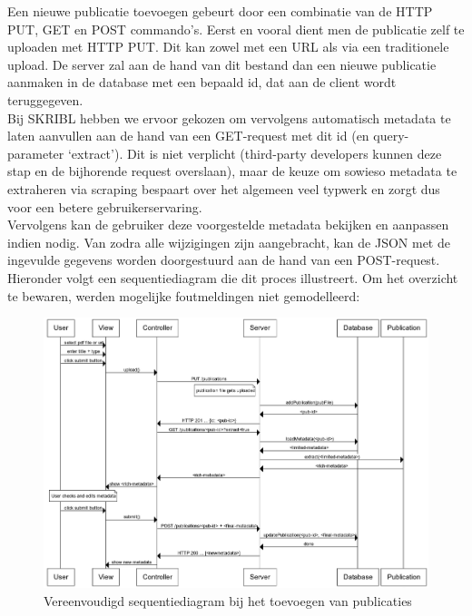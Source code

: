 \documentclass{article}
\begin{document}
Een nieuwe publicatie toevoegen gebeurt door een combinatie van de HTTP PUT, GET en POST commando's. Eerst en vooral dient men de publicatie zelf te uploaden met HTTP PUT. Dit kan zowel met een URL als via een traditionele upload. De server zal aan de hand van dit bestand dan een nieuwe publicatie aanmaken in de database met een bepaald id, dat aan de client wordt teruggegeven. \\

Bij SKRIBL hebben we ervoor gekozen om vervolgens automatisch metadata te laten aanvullen aan de hand van een GET-request met dit id (en query-parameter `extract'). Dit is niet verplicht (third-party developers kunnen deze stap en de bijhorende request overslaan), maar de keuze om sowieso metadata te extraheren via scraping bespaart over het algemeen veel typwerk en zorgt dus voor een betere gebruikerservaring. \\

Vervolgens kan de gebruiker deze voorgestelde metadata bekijken en aanpassen indien nodig. Van zodra alle wijzigingen zijn aangebracht, kan de JSON met de ingevulde gegevens worden doorgestuurd aan de hand van een POST-request. \\

Hieronder volgt een sequentiediagram die dit proces illustreert. Om het overzicht te bewaren, werden mogelijke foutmeldingen niet gemodelleerd:

\begin{figure}[!h]
\centering
 \includegraphics[width=165mm]{upload-sequence.png}
 \caption{Vereenvoudigd sequentiediagram bij het toevoegen van publicaties}
 \label{upload-sequence}
\end{figure}
\end{document}

